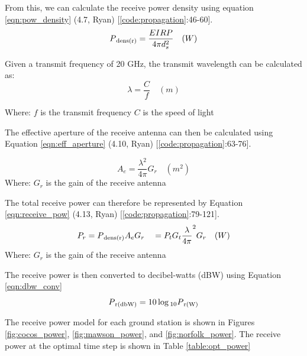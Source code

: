 \documentclass[12pt]{article}
\begin{document}
From this, we can calculate the receive power density using equation \ref{eqn:pow_density} (4.7, Ryan) [\ref{code:propagation}:46-60].
\begin{equation}
    P\textsubscript{dens(r)} = \frac{EIRP}{4 \pi d_s^2} \quad(W)
    \label{eqn:eirp}
\end{equation}

Given a transmit frequency of 20 GHz, the transmit wavelength can be calculated as:
\begin{equation}
    \lambda = \frac{C}{f} \quad (m)
    \label{eqn:pow_density}
\end{equation}

Where: \newline
\quad $f$ is the transmit frequency \newline
\quad $C$ is the speed of light \newline

The effective aperture of the receive antenna can then be calculated using Equation \ref{eqn:eff_aperture} (4.10, Ryan) [\ref{code:propagation}:63-76].

\begin{equation}
    A_e = \frac{\lambda^2}{4\pi} G_r \quad(m^2)
    \label{eqn:eff_aperture}
\end{equation}
Where: \newline
\quad $G_r$ is the gain of the receive antenna \newline

The total receive power can therefore be represented by Equation \ref{eqn:receive_pow} (4.13, Ryan) [\ref{code:propagation}:79-121].
\begin{equation}
    P_r = P\textsubscript{dens(r)} A_e G_r \newline
    \quad = P_t G_t \frac{\lambda}{4\pi}^2 G_r \quad (W)
    \label{eqn:receive_pow}
\end{equation}
Where: \newline
\quad $G_r$ is the gain of the receive antenna \newline

The receive power is then converted to decibel-watts (dBW) using Equation \ref{eqn:dbw_conv}
\begin{equation}
    P\textsubscript{r(dbW)} = 10\log\textsubscript{10}{P\textsubscript{r(W)}} \newline
    \label{eqn:dbw_conv}
\end{equation}

The receive power model for each ground station is shown in Figures \ref{fig:cocos_power}, \ref{fig:mawson_power}, and \ref{fig:norfolk_power}. The receive power at the optimal time step is shown in Table \ref{table:opt_power} 
\end{document}
